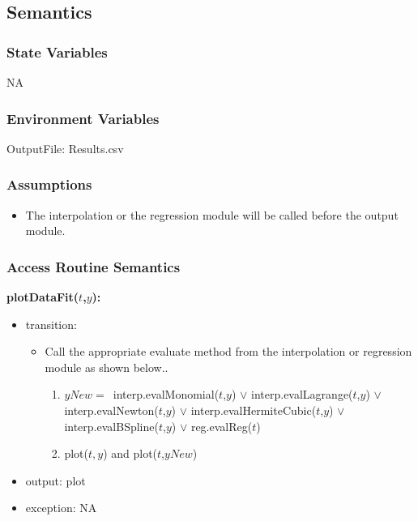 \documentclass[12pt, titlepage]{article}
\begin{document}
\subsection{Semantics}

\subsubsection{State Variables}
NA


\subsubsection{Environment Variables}


OutputFile: Results.csv

\subsubsection{Assumptions}

\begin{itemize}
	
	\item The interpolation or the regression module will be called before the 
	output module.
	
\end{itemize}
\subsubsection{Access Routine Semantics}



\noindent \textbf{plotDataFit($t$,$y$):}
\begin{itemize}
	\item transition: 
	\begin{itemize}
		\item Call the appropriate evaluate method from the interpolation or 
		regression module as shown below..
		
		\begin{enumerate}
			
			\item $yNew = $\ interp.evalMonomial($t$,$y$) $\lor$ 
			interp.evalLagrange($t$,$y$) $\lor$
			interp.evalNewton($t$,$y$) $\lor$
			interp.evalHermiteCubic($t$,$y$) $\lor$
			interp.evalBSpline($t$,$y$) $\lor$
			reg.evalReg($t$)
			
			\item plot($t,y$) and plot($t$,$yNew$)
\end{enumerate}	
	\end{itemize}

	\item output:  plot
	
	\item exception: NA
\end{itemize}
\end{document}
